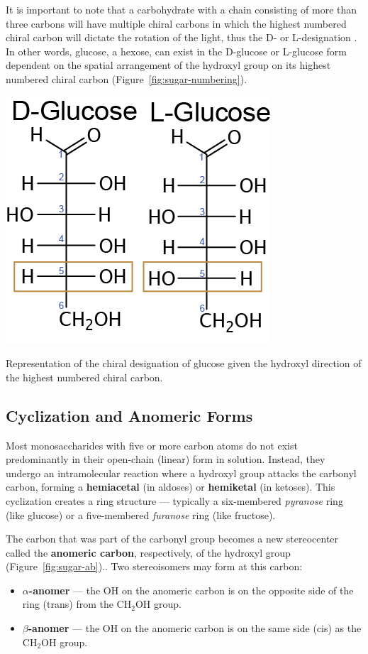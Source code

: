 \documentclass{tufte-handout}
\begin{document}
It is important to note that a carbohydrate with a chain consisting of more than three carbons will have multiple chiral carbons in which the highest numbered chiral carbon will dictate the rotation of the light, thus the D- or L-designation . In other words, glucose, a hexose, can exist in the D-glucose or L-glucose form dependent on the spatial arrangement of the hydroxyl group on its highest numbered chiral carbon (Figure~\ref{fig:sugar-numbering}).

\begin{marginfigure}
\includegraphics{figures/Glucose-DL.png}
\caption{Representation of the chiral designation of glucose given the hydroxyl direction of the highest numbered chiral carbon.}\label{fig:sugar-numbering}
\end{marginfigure}

\subsection*{Cyclization and Anomeric Forms}

Most monosaccharides with five or more carbon atoms do not exist predominantly in their open-chain (linear) form in solution. Instead, they undergo an intramolecular reaction where a hydroxyl group attacks the carbonyl carbon, forming a \textbf{hemiacetal} (in aldoses) or \textbf{hemiketal} (in ketoses). This cyclization creates a ring structure — typically a six-membered \textit{pyranose} ring (like glucose) or a five-membered \textit{furanose} ring (like fructose).

The carbon that was part of the carbonyl group becomes a new stereocenter called the \textbf{anomeric carbon}, respectively, of the hydroxyl group (Figure~\ref{fig:sugar-ab}).. Two stereoisomers may form at this carbon:
\begin{itemize}
\item \textbf{$\alpha$-anomer} — the OH on the anomeric carbon is on the opposite side of the ring (trans) from the CH$_2$OH group.
\item \textbf{$\beta$-anomer} — the OH on the anomeric carbon is on the same side (cis) as the CH$_2$OH group.
\end{itemize}
\end{document}
